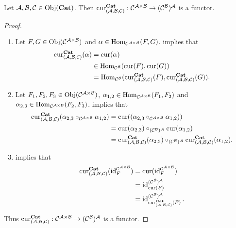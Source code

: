 \documentclass{book}
\begin{document}
	\begin{ex} 
		Let $\MA, \MB, \MC \in \Obj(\bCat)$. Then $\cur^{\bCat}_{(\MA, \MB, \MC)}: \MC^{\MA \times \MB} \rightarrow (\MC^{\MB})^{\MA}$ is a functor.
	\end{ex}
	
	\begin{proof}\
		\begin{enumerate}
			\item Let $F,G \in \Obj(\MC^{\MA \times \MB})$ and $\al \in \Hom_{\MC^{\MA \times \MB}}(F, G)$.  implies that
			\begin{align*}
				\cur^{\bCat}_{(\MA, \MB, \MC)}(\al)
				& = \cur(\al) \\
				& \in \Hom_{\MC^{\MB}}(\cur(F), \cur(G)) \\
				& = \Hom_{\MC^{\MB}}(\cur^{\bCat}_{(\MA, \MB, \MC)}(F), \cur^{\bCat}_{(\MA, \MB, \MC)}(G)).
			\end{align*}
			\item Let $F_1, F_2, F_3 \in \Obj(\MC^{\MA \times \MB})$, $\al_{1,2} \in \Hom_{\MC^{\MA \times \MB}}(F_1, F_2)$ and $\al_{2,3} \in \Hom_{\MC^{\MA \times \MB}}(F_2, F_3)$.  implies that
			\begin{align*}
				\cur^{\bCat}_{(\MA, \MB, \MC)}(\al_{2,3} \circ_{\MC^{\MA \times \MB}} \al_{1,2})
				 & = \cur((\al_{2,3} \circ_{\MC^{\MA \times \MB}} \al_{1,2})) \\
				 & = \cur(\al_{2,3}) \circ_{(\MC^{\MB})^{\MA}} \cur(\al_{1,2}) \\
				 & = \cur^{\bCat}_{(\MA, \MB, \MC)}(\al_{2,3}) \circ_{(\MC^{\MB})^{\MA}} \cur^{\bCat}_{(\MA, \MB, \MC)}(\al_{1,2}).
			\end{align*}
			\item {} implies that 
			\begin{align*}
				\cur^{\bCat}_{(\MA, \MB, \MC)}(\id_F^{\MC^{\MA \times \MB}}) 
				& = \cur(\id_F^{\MC^{\MA \times \MB}}) \\
				& = \id_{\cur(F)}^{(\MC^{\MB})^{\MA}} \\
				& = \id_{\cur^{\bCat}_{(\MA, \MB, \MC)}(F)}^{(\MC^{\MB})^{\MA}}.
			\end{align*}
		\end{enumerate}
		Thus $\cur^{\bCat}_{(\MA, \MB, \MC)}: \MC^{\MA \times \MB} \rightarrow (\MC^{\MB})^{\MA}$ is a functor.
	\end{proof}
	
\end{document}
